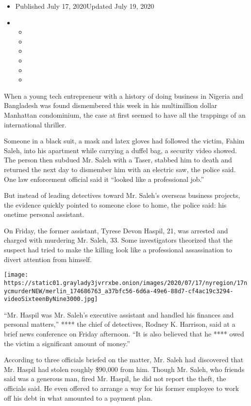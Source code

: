 \begin{itemize}
\item
  Published July 17, 2020Updated July 19, 2020
\item
  \begin{itemize}
  \item
  \item
  \item
  \item
  \item
  \item
  \end{itemize}
\end{itemize}

When a young tech entrepreneur with a history of doing business in
Nigeria and Bangladesh was found dismembered this week in his
multimillion dollar Manhattan condominium, the case at first seemed to
have all the trappings of an international thriller.

Someone in a black suit, a mask and latex gloves had followed the
victim, Fahim Saleh, into his apartment while carrying a duffel bag, a
security video showed. The person then subdued Mr. Saleh with a Taser,
stabbed him to death and returned the next day to dismember him with an
electric saw, the police said. One law enforcement official said it
``looked like a professional job.''

But instead of leading detectives toward Mr. Saleh's overseas business
projects, the evidence quickly pointed to someone close to home, the
police said: his onetime personal assistant.

On Friday, the former assistant, Tyrese Devon Haspil, 21, was arrested
and charged with murdering Mr. Saleh, 33. Some investigators theorized
that the suspect had tried to make the killing look like a professional
assassination to divert attention from himself.

\texttt{[image: https://static01.graylady3jvrrxbe.onion/images/2020/07/17/nyregion/17nycmurderNEW/merlin\_174686763\_a37bfc56-6d6a-49e6-88d7-cf4ac19c3294-videoSixteenByNine3000.jpg]}

``Mr. Haspil was Mr. Saleh's executive assistant and handled his
finances and personal matters,'' **** the chief of detectives, Rodney K.
Harrison, said at a brief news conference on Friday afternoon. ``It is
also believed that he **** owed the victim a significant amount of
money.''

According to three officials briefed on the matter, Mr. Saleh had
discovered that Mr. Haspil had stolen roughly \$90,000 from him. Though
Mr. Saleh, who friends said was a generous man, fired Mr. Haspil, he did
not report the theft, the officials said. He even offered to arrange a
way for his former employee to work off his debt in what amounted to a
payment plan.

